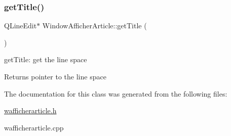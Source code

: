 \subsubsection{\texorpdfstring{get\+Title()}{getTitle()}}
{\footnotesize\ttfamily Q\+Line\+Edit$\ast$ Window\+Afficher\+Article\+::get\+Title (\begin{DoxyParamCaption}{ }\end{DoxyParamCaption})\hspace{0.3cm}{\ttfamily [inline]}}



get\+Title\+: get the line space 

\begin{DoxyReturn}{Returns}
pointer to the line space 
\end{DoxyReturn}


The documentation for this class was generated from the following files\+:\begin{DoxyCompactItemize}
\item 
\hyperlink{wafficherarticle_8h}{wafficherarticle.\+h}\item 
wafficherarticle.\+cpp\end{DoxyCompactItemize}
